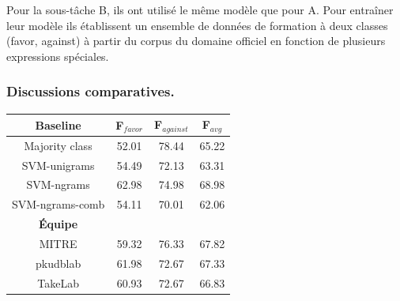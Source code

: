\documentclass[11pt,a4paper,oldfontcommands]{memoir}
\begin{document}
Pour la sous-tâche B, ils ont utilisé le même modèle que pour A.
Pour entraîner leur modèle ils établissent un ensemble de données de formation à deux classes (favor, against) à partir du corpus du domaine officiel en fonction de plusieurs expressions spéciales.

\subsubsection{Discussions comparatives.}
\begin{center}
 \begin{tabular}{| c | c | c || c |}
  \hline
  \textbf{Baseline} & \textbf{F$_{favor}$} & \textbf{F$_{against}$} & \textbf{F$_{avg}$} \\
  \hline
  Majority class    & 52.01                & 78.44                  & 65.22              \\
  SVM-unigrams      & 54.49                & 72.13                  & 63.31              \\
  SVM-ngrams        & 62.98                & 74.98                  & 68.98              \\
  SVM-ngrams-comb   & 54.11                & 70.01                  & 62.06              \\
  \hline
  \textbf{Équipe}   &                      &                        &                    \\
  \hline
  MITRE             & 59.32                & 76.33                  & 67.82              \\
  pkudblab          & 61.98                & 72.67                  & 67.33              \\
  TakeLab           & 60.93                & 72.67                  & 66.83              \\
  \hline
 \end{tabular}
\end{center}
\end{document}
